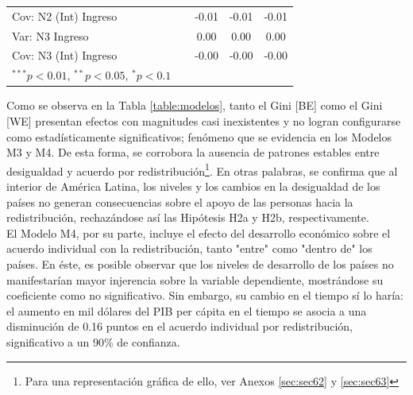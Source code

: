 \documentclass[12pt,letterpaper]{article}
\begin{document}
\begin{landscape}
\begin{table}
\begin{center}
\begin{tabular}{l c{} c{} c{} c{} c{} c{} c{} c{} c{}}
				Cov: N2 (Int) Ingreso &            &             &             &             &            &            & -0.01       & -0.01       & -0.01       \\
				Var: N3 Ingreso                 &            &             &             &             &            &            & 0.00        & 0.00        & 0.00        \\
				Cov: N3 (Int) Ingreso     &            &             &             &             &            &            & -0.00       & -0.00       & -0.00       \\
				\hline
				\multicolumn{10}{l}{\scriptsize{$^{***}p<0.01$, $^{**}p<0.05$, $^*p<0.1$}}
			\end{tabular}
		\end{center}
	\end{table}
	
\end{landscape}


Como se observa en la Tabla \ref{table:modelos}, tanto el Gini [BE] como el Gini [WE] presentan efectos con magnitudes casi inexistentes y no logran configurarse como estadísticamente significativos; fenómeno que se evidencia en los Modelos M3 y M4. De esta forma, se corrobora la ausencia de patrones estables entre desigualdad y acuerdo por redistribución\footnote{Para una representación gráfica de ello, ver Anexos \ref{sec:sec62} y \ref{sec:sec63}}. En otras palabras, se confirma que al interior de América Latina, los niveles y los cambios en la desigualdad de los países no generan consecuencias sobre el apoyo de las personas hacia la redistribución, rechazándose así las Hipótesis H2a y H2b, respectivamente.\\

El Modelo M4, por su parte, incluye el efecto del desarrollo económico sobre el acuerdo individual con la redistribución, tanto "entre" como "dentro de" los países. En éste, es posible observar que los niveles de desarrollo de los países no manifestarían mayor injerencia sobre la variable dependiente, mostrándose su coeficiente como no significativo. Sin embargo, su cambio en el tiempo sí lo haría: el aumento en mil dólares del PIB per cápita en el tiempo se asocia a una disminución  de 0.16 puntos en el acuerdo individual por redistribución, significativo a un 90\% de confianza.\\
\end{document}
